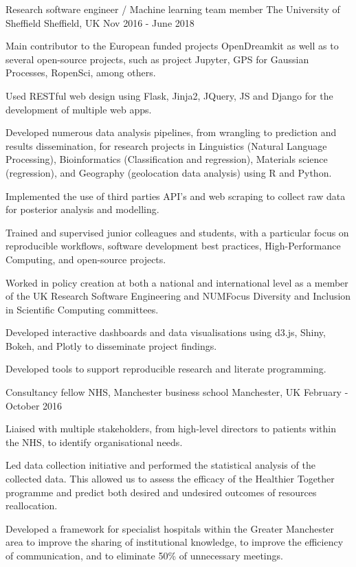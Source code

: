 \begin{cventries}
\cventry
{Research software engineer  / Machine learning team member } %
{The University of Sheffield } %
{Sheffield, UK} %
{Nov 2016 - June 2018 } %
{ %
\begin{cvitems}
\item {Main contributor to the European funded projects OpenDreamkit as well as to several open-source projects, such as project Jupyter, GPS for Gaussian Processes, RopenSci, among others.}
\item {Used RESTful web design using Flask, Jinja2, JQuery, JS and Django for the development of multiple web apps.}
\item {Developed numerous data analysis pipelines, from wrangling to prediction and results dissemination, for research projects in Linguistics (Natural Language Processing), Bioinformatics (Classification and regression), Materials science (regression), and Geography (geolocation data analysis) using R and Python.}
\item { Implemented the use of third parties API's and web scraping to collect raw data for posterior analysis and modelling.}
\item {Trained and supervised junior colleagues and students, with a particular focus on reproducible workflows, software development best practices, High-Performance Computing, and open-source projects.}
\item {Worked in policy creation at both a national and international level as a member of the UK Research Software Engineering and NUMFocus Diversity and Inclusion in Scientific Computing committees.}
\item {Developed interactive dashboards and data visualisations using d3.js, Shiny, Bokeh, and Plotly to disseminate project findings.}
\item{Developed tools to support reproducible research and literate programming.}
\end{cvitems}
}



\cventry
{Consultancy fellow}
{NHS, Manchester business school}
{Manchester, UK}
{February - October 2016}
{
\begin{cvitems}
\item {Liaised with multiple stakeholders, from high-level directors to patients within the NHS, to identify organisational needs.}
\item  {Led data collection initiative and performed the statistical analysis of the collected data. This allowed us to assess the efficacy of the Healthier Together programme and predict both desired and undesired outcomes of resources reallocation.}
\item{Developed a framework for specialist hospitals within the Greater Manchester area to improve the sharing of institutional knowledge, to improve the efficiency of communication, and to eliminate 50\% of unnecessary meetings.}
\end{cvitems}
}



\end{cventries}
